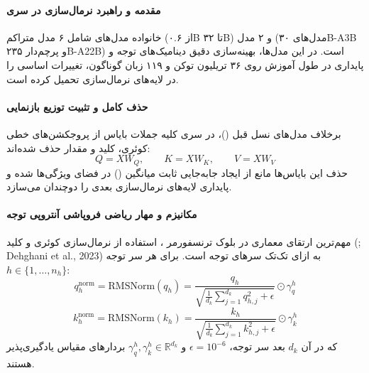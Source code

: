 \item {}

\paragraph*{مقدمه و راهبرد نرمال‌سازی در سری }
خانواده مدل‌های  \cite{qwen2025qwen3} شامل ۶ مدل متراکم (از ۰.۶B تا ۳۲B) و ۲ مدل  (مدل‌های ۳۰B-A3B و پرچم‌دار ۲۳۵B-A22B) است. در این مدل‌ها، بهینه‌سازی دقیق دینامیک‌های توجه و پایداری در طول آموزش روی ۳۶ تریلیون توکن و ۱۱۹ زبان گوناگون، تغییرات اساسی را در لایه‌های نرمال‌سازی تحمیل کرده است.

\paragraph*{حذف کامل  و تثبیت توزیع بازنمایی}
برخلاف مدل‌های نسل قبل ()، در سری  کلیه جملات بایاس از پروجکشن‌های خطی کوئری، کلید و مقدار حذف شده‌اند:
\begin{equation}
    Q = X W_Q, \qquad K = X W_K, \qquad V = X W_V
\end{equation}
حذف این بایاس‌ها مانع از ایجاد جابه‌جایی ثابت میانگین () در فضای ویژگی‌ها شده و پایداری لایه‌های نرمال‌سازی بعدی را دوچندان می‌سازد.

\paragraph*{مکانیزم  و مهار ریاضی فروپاشی آنتروپی توجه}
مهم‌ترین ارتقای معماری در بلوک ترنسفورمر ، استفاده از نرمال‌سازی کوئری و کلید (; Dehghani et al., 2023) به ازای تک‌تک سرهای توجه است. برای هر سر توجه $h \in \{1, \dots, n_h\}$:
\begin{equation}
    q_h^{\text{norm}} = \text{RMSNorm}(q_h) = \frac{q_h}{\sqrt{\frac{1}{d_k}\sum_{j=1}^{d_k} q_{h,j}^2 + \epsilon}} \odot \gamma_q^h
\end{equation}
\begin{equation}
    k_h^{\text{norm}} = \text{RMSNorm}(k_h) = \frac{k_h}{\sqrt{\frac{1}{d_k}\sum_{j=1}^{d_k} k_{h,j}^2 + \epsilon}} \odot \gamma_k^h
\end{equation}
که در آن $d_k$ بعد سر توجه، $\epsilon = 10^{-6}$ و $\gamma_q^h, \gamma_k^h \in \mathbb{R}^{d_k}$ بردارهای مقیاس یادگیری‌پذیر هستند.

